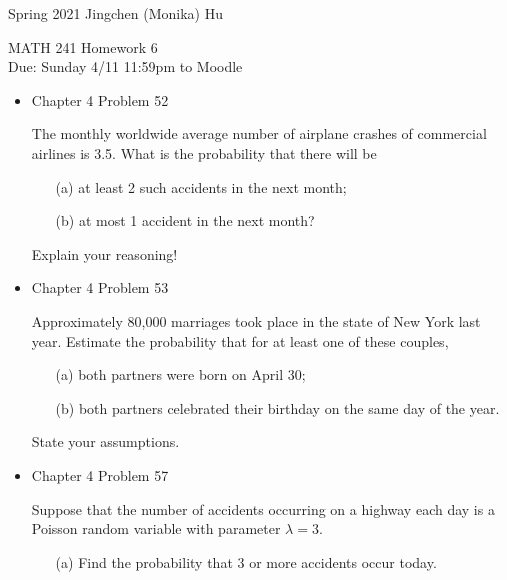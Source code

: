 \documentclass[11pt]{article}
\begin{document}
\enlargethispage{\baselineskip}

Spring 2021 \hfill Jingchen (Monika) Hu\\

\begin{center}
{\huge MATH 241 Homework 6}	\\
Due: Sunday 4/11 11:59pm to Moodle
\end{center}
\vspace{0.5cm}
\begin{itemize}

   
    \item
    Chapter 4 Problem  52
    
    The monthly worldwide average number of airplane crashes of commercial airlines is 3.5. What is the probability that there will be
    
    \begin{itemize}
    \item[(a)] at least 2 such accidents in the next month;
    
    \item[(b)] at most 1 accident in the next month?
    \end{itemize}
    Explain your reasoning!

    \item
    Chapter 4 Problem  53
    
    Approximately 80,000 marriages took place in the state of New York last year. Estimate the probability that for at least one of these couples,
    
    \begin{itemize}
    \item[(a)] both partners were born on April 30;
    
    \item[(b)] both partners celebrated their birthday on the same day of the year.
    \end{itemize}
    State your assumptions.

    \item
    Chapter 4 Problem  57
    
    Suppose that the number of accidents occurring on a highway each day is a Poisson random variable with parameter $\lambda = 3$.
    
    \begin{itemize}
    \item[(a)] Find the probability that 3 or more accidents occur today.
    

\end{itemize}
\end{itemize}
\end{document}
